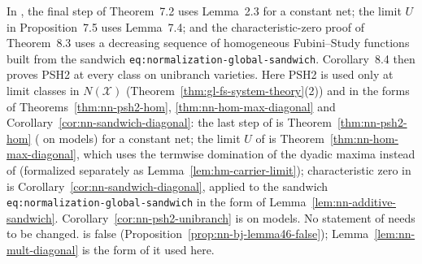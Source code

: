 \begin{remark}\label{rmk:nn-sources}
\notready
{}
In \cite{FHX}, the final step of Theorem~7.2 uses Lemma~2.3 for a constant net;
the limit $U$ in Proposition~7.5 uses Lemma~7.4; and the characteristic-zero proof of
Theorem~8.3 uses a decreasing sequence of homogeneous Fubini--Study functions built from
the sandwich \texttt{eq:normalization-global-sandwich}. Corollary~8.4 then proves PSH2 at
every class on unibranch varieties. Here PSH2
is used only at limit classes in $N(\mathcal X)$ (Theorem~\ref{thm:gl-fs-system-theory}(2)) and in the forms of
Theorems~\ref{thm:nn-psh2-hom}, \ref{thm:nn-hom-max-diagonal} and Corollary~\ref{cor:nn-sandwich-diagonal}: the last step of
\cite[Theorem~7.2]{FHX} is Theorem~\ref{thm:nn-psh2-hom} (\cite[Lemma~2.3]{FHX} on models) for a constant net; the limit $U$ of
\cite[Proposition~7.5]{FHX} is Theorem~\ref{thm:nn-hom-max-diagonal}, which uses the termwise domination of the dyadic maxima instead of
\cite[Lemma~7.4]{FHX} (formalized separately as Lemma~\ref{lem:hm-carrier-limit}); characteristic zero in \cite[Theorem~8.3]{FHX} is
Corollary~\ref{cor:nn-sandwich-diagonal}, applied to the sandwich \texttt{eq:normalization-global-sandwich} in the form of
Lemma~\ref{lem:nn-additive-sandwich}. Corollary~\ref{cor:nn-psh2-unibranch} is \cite[Corollary~8.4]{FHX} on models. No statement of
\cite{FHX} needs to be changed.
\cite[Lemma~4.6]{BJ22} is false (Proposition~\ref{prop:nn-bj-lemma46-false}); Lemma~\ref{lem:nn-mult-diagonal} is the form of it used
here.
\end{remark}
